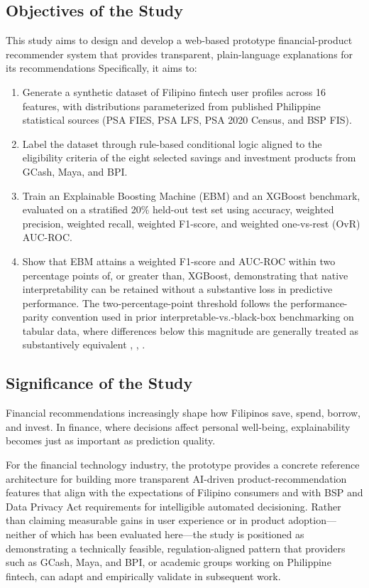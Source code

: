 \documentclass{icsthesis}
\begin{document}
\begin{mainmatter}
            \subsection{Objectives of the Study}
				This study aims to design and develop a web-based prototype financial-product recommender system that provides transparent, plain-language explanations for its recommendations Specifically, it aims to:

                \begin{enumerate}
                    \item Generate a synthetic dataset of Filipino fintech user profiles across 16 features, with distributions parameterized from published Philippine statistical sources (PSA FIES, PSA LFS, PSA 2020 Census, and BSP FIS).
                    \item Label the dataset through rule-based conditional logic aligned to the eligibility criteria of the eight selected savings and investment products from GCash, Maya, and BPI.
                    \item Train an Explainable Boosting Machine (EBM) and an XGBoost benchmark, evaluated on a stratified 20\% held-out test set using accuracy, weighted precision, weighted recall, weighted F1-score, and weighted one-vs-rest (OvR) AUC-ROC.
                    \item Show that EBM attains a weighted F1-score and AUC-ROC within two percentage points of, or greater than, XGBoost, demonstrating that native interpretability can be retained without a substantive loss in predictive performance. The two-percentage-point threshold follows the performance-parity convention used in prior interpretable-vs.-black-box benchmarking on tabular data, where differences below this magnitude are generally treated as substantively equivalent \cite{ref15}, \cite{ref50}, \cite{ref51}. 
                \end{enumerate}
                
            \subsection{Significance of the Study}
				Financial recommendations increasingly shape how Filipinos save, spend, borrow, and invest. In finance, where decisions affect personal well-being, explainability becomes just as important as prediction quality.

                For the financial technology industry, the prototype provides a concrete reference architecture for building more transparent AI-driven product-recommendation features that align with the expectations of Filipino consumers and with BSP and Data Privacy Act requirements for intelligible automated decisioning. Rather than claiming measurable gains in user experience or in product adoption---neither of which has been evaluated here---the study is positioned as demonstrating a technically feasible, regulation-aligned pattern that providers such as GCash, Maya, and BPI, or academic groups working on Philippine fintech, can adapt and empirically validate in subsequent work.


\end{mainmatter}
\end{document}
